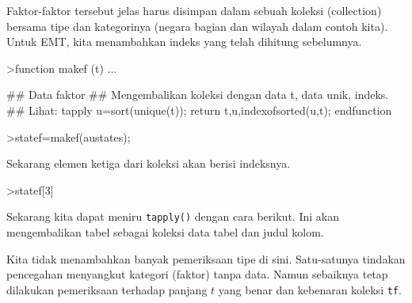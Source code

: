 \documentclass[a4paper,11pt,oneside,enabledeprecatedfontcommands]{scrbook}
\newenvironment{eulernotebook}{}{}
\newenvironment{eulercomment}{\par\medskip\noindent}{\par\medskip}
\begin{document}
\begin{eulernotebook}
\begin{eulercomment}
			Faktor-faktor tersebut jelas harus disimpan dalam sebuah koleksi (collection) bersama tipe dan
			kategorinya (negara bagian dan wilayah dalam contoh kita). Untuk EMT, kita menambahkan indeks yang
			telah dihitung sebelumnya.
		\end{eulercomment}
		\begin{eulerprompt}
			>function makef (t) ...
		\end{eulerprompt}
		\begin{eulerudf}
			## Data faktor
			## Mengembalikan koleksi dengan data t, data unik, indeks.
			## Lihat: tapply
			u=sort(unique(t));
			return {{t,u,indexofsorted(u,t)}};
			endfunction
		\end{eulerudf}
		\begin{eulerprompt}
			>statef=makef(austates);
		\end{eulerprompt}
		\begin{eulercomment}
			Sekarang elemen ketiga dari koleksi akan berisi indeksnya.
		\end{eulercomment}
		\begin{eulerprompt}
			>statef[3]
		\end{eulerprompt}
		\begin{euleroutput}
			[6,  5,  4,  2,  2,  3,  8,  8,  4,  7,  2,  7,  4,  4,  5,  6,  5,  3,  8,  7,  4,  2,  2,  8,  5,
			1,  2,  7,  7,  1]
		\end{euleroutput}
		\begin{eulercomment}
			Sekarang kita dapat meniru \texttt{tapply()} dengan cara berikut. Ini akan mengembalikan tabel sebagai koleksi
			data tabel dan judul kolom.
		\end{eulercomment}
		\begin{eulercomment}
			Kita tidak menambahkan banyak pemeriksaan tipe di sini. Satu-satunya tindakan pencegahan menyangkut
			kategori (faktor) tanpa data. Namun sebaiknya tetap dilakukan pemeriksaan terhadap panjang $t$ yang
			benar dan kebenaran koleksi \texttt{tf}.
			

\end{eulercomment}
\end{eulernotebook}
\end{document}
